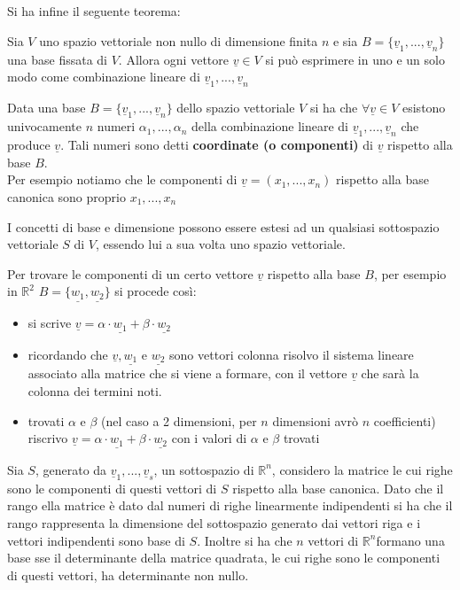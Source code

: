 \documentclass[a4paper,12pt, oneside]{book}
\begin{document}
Si ha infine il seguente teorema:
\begin{teorema}
	Sia $V$ uno spazio vettoriale non nullo di dimensione finita $n$ e sia $B=\{\underline{v}_1,...,\underline{v}_n\}$ una base fissata di $V$. Allora ogni vettore $\underline{v}\in V$ si può esprimere in uno e un solo modo come combinazione lineare di $\underline{v}_1,...,\underline{v}_n$
\end{teorema}
\begin{definizione}
	Data una base $B=\{\underline{v}_1,...,\underline{v}_n\}$ dello spazio vettoriale $V$ si ha che $\forall \underline{v}\in V$ esistono univocamente $n$ numeri $\alpha_1,...,\alpha_n$ della combinazione lineare di $\underline{v}_1,...,\underline{v}_n$ che produce $\underline{v}$. Tali numeri sono detti \textbf{coordinate (o componenti)} di $\underline{v}$ rispetto alla base $B$.\\
	Per esempio notiamo che le componenti di $\underline{v}=(x_1,...,x_n)$ rispetto alla base canonica sono proprio $x_1,...,x_n$
\end{definizione}
\begin{shaded}
	I concetti di base e dimensione possono essere estesi ad un qualsiasi sottospazio vettoriale $S$ di $V$, essendo lui a sua volta uno spazio vettoriale.
\end{shaded}
\begin{nota}
	Per trovare le componenti di un certo vettore $\underline{v}$ rispetto alla base $B$, per esempio in $\mathbb{R}^2$ $B=\{\underline{w_1},\underline{w_2}\}$ si procede così:
	\begin{itemize}
		\item si scrive $\underline{v}=\alpha\cdot \underline{w_1}+\beta\cdot \underline{w_2}$
		\item ricordando che $\underline{v},\underline{w_1}$ e $\underline{w_2}$ sono vettori colonna risolvo il sistema lineare associato alla matrice che si viene a formare, con il vettore $\underline{v}$ che sarà la colonna dei termini noti.
		\item trovati $\alpha$  e $\beta$ (nel caso a 2 dimensioni, per $n$ dimensioni avrò $n$ coefficienti) riscrivo $\underline{v}=\alpha\cdot \underline{w_1}+\beta\cdot \underline{w_2}$ con i valori di $\alpha$ e $\beta$ trovati
	\end{itemize}
\end{nota}
\begin{nota}
	Sia $S$, generato da $\underline{v}_1,...,\underline{v}_s$,  un sottospazio di $\mathbb{R}^n$, considero la matrice le cui righe sono le componenti di questi vettori di $S$ rispetto alla base canonica. Dato che il rango ella matrice è dato dal numeri di righe linearmente indipendenti si ha che il rango rappresenta la dimensione del sottospazio generato dai vettori riga e i vettori indipendenti sono base di $S$. Inoltre si ha che $n$ vettori di $\mathbb{R}^n$formano una base sse il determinante della matrice quadrata, le cui righe sono le componenti di questi vettori, ha determinante non nullo.
\end{nota}
\end{document}
